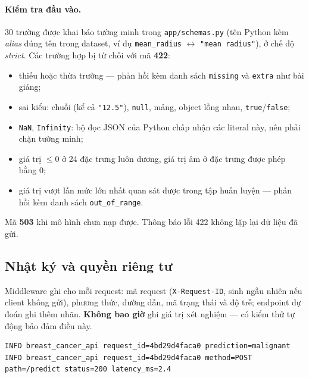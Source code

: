 \documentclass[12pt]{article}
\begin{document}
\paragraph{Kiểm tra đầu vào.} 30 trường được khai báo tường minh trong \texttt{app/schemas.py} (tên Python kèm
\emph{alias} đúng tên trong dataset, ví dụ \texttt{mean\_radius} $\leftrightarrow$ \texttt{"mean radius"}), ở chế độ
\emph{strict}. Các trường hợp bị từ chối với mã \textbf{422}:
\begin{itemize}
  \item thiếu hoặc thừa trường --- phản hồi kèm danh sách \texttt{missing} và \texttt{extra} như bài giảng;
  \item sai kiểu: chuỗi (kể cả \texttt{"12.5"}), \texttt{null}, mảng, object lồng nhau, \texttt{true}/\texttt{false};
  \item \texttt{NaN}, \texttt{Infinity}: bộ đọc JSON của Python chấp nhận các literal này, nên phải chặn tường minh;
  \item giá trị $\leq 0$ ở 24 đặc trưng luôn dương, giá trị âm ở \NZeroFeatures{} đặc trưng được phép bằng 0;
  \item giá trị vượt \UpperFactor{} lần mức lớn nhất quan sát được trong tập huấn luyện --- phản hồi kèm danh sách
        \texttt{out\_of\_range}.
\end{itemize}
Mã \textbf{503} khi mô hình chưa nạp được. Thông báo lỗi 422 không lặp lại dữ liệu đã gửi.

\subsection{Nhật ký và quyền riêng tư}
Middleware ghi cho mỗi request: mã request (\texttt{X-Request-ID}, sinh ngẫu nhiên nếu client không gửi), phương
thức, đường dẫn, mã trạng thái và độ trễ; endpoint dự đoán ghi thêm nhãn. \textbf{Không bao giờ} ghi giá trị xét
nghiệm --- có kiểm thử tự động bảo đảm điều này.

\begin{lstlisting}[language={},numbers=none,caption={Một dòng log khi dự đoán}]
INFO breast_cancer_api request_id=4bd29d4faca0 prediction=malignant
INFO breast_cancer_api request_id=4bd29d4faca0 method=POST path=/predict status=200 latency_ms=2.4
\end{lstlisting}
\end{document}
